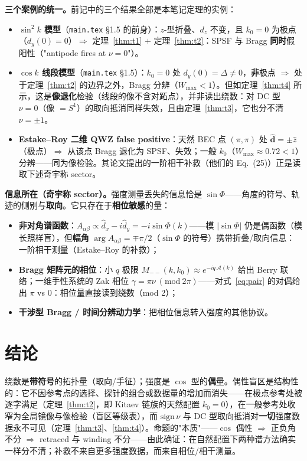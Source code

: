 \documentclass[onecolumn,aps,prl,superscriptaddress,longbibliography]{revtex4-2}
\begin{document}
\textbf{三个案例的统一。}前记中的三个结果全部是本笔记定理的实例：
\begin{itemize}
\item \textbf{$\sin^2k$ 模型}（\texttt{main.tex} §1.5 的前身）：$z$-型折叠、$d_z$ 不变，且 $k_0=0$ 为极点（$d_y(0)=0$）$\Rightarrow$ 定理~\ref{thm:t1} $+$ 定理~\ref{thm:t2}：SPSF 与 Bragg \textbf{同时}假阳性（"antipode fires at $\nu=0$"）。
\item \textbf{$\cos k$ 线段模型}（\texttt{main.tex} §1.5）：$k_0=0$ 处 $d_y(0)=\Delta\neq0$，\textbf{非}极点 $\Rightarrow$ 处于定理~\ref{thm:t2} 的边界之外，Bragg 分辨（$W_{\max}<1$）。但如定理~\ref{thm:t4} 所示，这是\textbf{像退化}检验（线段的像不含对跖点），并非读出绕数：对 DC 型 $\nu=0$（像 $=S^1$）的取向抵消同样失效，且由定理~\ref{thm:t3}，它也分不清 $\nu=\pm1$。
\item \textbf{Estake--Roy 二维 QWZ false positive}：天然 BEC 点 $(\pi,\pi)$ 处 $\hat{\mathbf{d}}=\pm\hat z$（极点）$\Rightarrow$ 从该点 Bragg 退化为 SPSF、失效；一般 $k_0$（$W_{\max}\approx0.72<1$）分辨——同为像检验。其论文提出的一阶相干补救（他们的 Eq.~(25)）正是读取下述奇宇称 sector。
\end{itemize}

\textbf{信息所在（奇宇称 sector）。}强度测量丢失的信息恰是 $\sin\Phi$——角度的符号、轨迹的侧别与\textbf{取向}。它只存在于\textbf{相位敏感}的量：
\begin{itemize}
\item \textbf{非对角谱函数}：$A_{\alpha\beta}\propto\hat d_x-i\hat d_y=-i\sin\Phi(k)$——模 $|\sin\Phi|$ 仍是偶函数（模长照样盲），但\textbf{幅角} $\arg A_{\alpha\beta}=\mp\pi/2$（$\sin\Phi$ 的符号）携带折叠/取向信息：一阶相干测量（Estake--Roy 的补救）；
\item \textbf{Bragg 矩阵元的相位}：小 $q$ 极限 $M_{--}(k,k_0)\approx e^{-iq\,\mathcal{A}(k)}$ 给出 Berry 联络；一维手性系统的 Zak 相位 $\gamma=\pi\nu\ (\mathrm{mod}\ 2\pi)$——对式~\eqref{eq:pair} 的对偶给出 $\pi$ vs $0$：相位量直接读到绕数（mod 2）；
\item \textbf{干涉型 Bragg / 时间分辨动力学}：把相位信息转入强度的其他协议。
\end{itemize}

\section{结论}\label{sec:conclusion}

绕数是\textbf{带符号}的拓扑量（取向/手征）；强度是 $\cos$ 型的\textbf{偶}量。偶性盲区是结构性的：它不因参考点的选择、探针的组合或数据量的增加而消失——在极点参考处被逐字满足（定理~\ref{thm:t2}，即 Kitaev 链族的天然配置 $k_0=0$），在一般参考处收窄为全局镜像与像检验（盲区等级表），而 $\mathrm{sign}\,\nu$ 与 DC 型取向抵消对\textbf{一切}强度数据永不可见（定理~\ref{thm:t3}、\ref{thm:t4}）。命题的"本质"——$\cos$ 偶性 $\Rightarrow$ 正负角不分 $\Rightarrow$ retraced 与 winding 不分——由此确证：在自然配置下两种谱方法确实一样分不清；补救不来自更多强度数据，而来自相位/相干测量。
\end{document}
